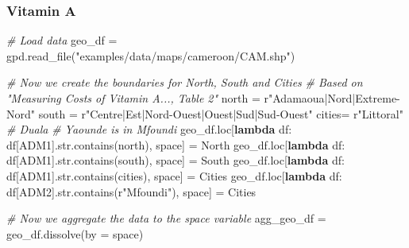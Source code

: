 \documentclass[
]{article}
\newenvironment{Shaded}{}{}
\newcommand{\BuiltInTok}[1]{#1}
\newcommand{\CommentTok}[1]{\textcolor[rgb]{0.38,0.63,0.69}{\textit{#1}}}
\newcommand{\KeywordTok}[1]{\textcolor[rgb]{0.00,0.44,0.13}{\textbf{#1}}}
\newcommand{\NormalTok}[1]{#1}
\newcommand{\OperatorTok}[1]{\textcolor[rgb]{0.40,0.40,0.40}{#1}}
\newcommand{\StringTok}[1]{\textcolor[rgb]{0.25,0.44,0.63}{#1}}
\newcommand{\VerbatimStringTok}[1]{\textcolor[rgb]{0.25,0.44,0.63}{#1}}
\begin{document}
\hypertarget{vitamin-a}{%
\subsubsection{Vitamin A}\label{vitamin-a}}

\begin{Shaded}
\begin{Highlighting}[numbers=left,,firstnumber=152,]
\CommentTok{\# Load data}
\NormalTok{geo\_df }\OperatorTok{=}\NormalTok{ gpd.read\_file(}\StringTok{"examples/data/maps/cameroon/CAM.shp"}\NormalTok{)}

\CommentTok{\# Now we create the boundaries for North, South and Cities}
\CommentTok{\# Based on "Measuring Costs of Vitamin A..., Table 2"}
\NormalTok{north }\OperatorTok{=} \VerbatimStringTok{r"Adamaoua|Nord|Extreme{-}Nord"}
\NormalTok{south }\OperatorTok{=} \VerbatimStringTok{r"Centre|Est|Nord{-}Ouest|Ouest|Sud|Sud{-}Ouest"}
\NormalTok{cities}\OperatorTok{=} \VerbatimStringTok{r"Littoral"} \CommentTok{\# Duala}
\CommentTok{\# Yaounde is in Mfoundi}
\NormalTok{geo\_df.loc[}\KeywordTok{lambda}\NormalTok{ df: df[}\StringTok{\textquotesingle{}ADM1\textquotesingle{}}\NormalTok{].}\BuiltInTok{str}\NormalTok{.contains(north), }\StringTok{\textquotesingle{}space\textquotesingle{}}\NormalTok{] }\OperatorTok{=} \StringTok{\textquotesingle{}North\textquotesingle{}}
\NormalTok{geo\_df.loc[}\KeywordTok{lambda}\NormalTok{ df: df[}\StringTok{\textquotesingle{}ADM1\textquotesingle{}}\NormalTok{].}\BuiltInTok{str}\NormalTok{.contains(south), }\StringTok{\textquotesingle{}space\textquotesingle{}}\NormalTok{] }\OperatorTok{=} \StringTok{\textquotesingle{}South\textquotesingle{}}
\NormalTok{geo\_df.loc[}\KeywordTok{lambda}\NormalTok{ df: df[}\StringTok{\textquotesingle{}ADM1\textquotesingle{}}\NormalTok{].}\BuiltInTok{str}\NormalTok{.contains(cities), }\StringTok{\textquotesingle{}space\textquotesingle{}}\NormalTok{] }\OperatorTok{=} \StringTok{\textquotesingle{}Cities\textquotesingle{}}
\NormalTok{geo\_df.loc[}\KeywordTok{lambda}\NormalTok{ df: df[}\StringTok{\textquotesingle{}ADM2\textquotesingle{}}\NormalTok{].}\BuiltInTok{str}\NormalTok{.contains(}\VerbatimStringTok{r"Mfoundi"}\NormalTok{), }\StringTok{\textquotesingle{}space\textquotesingle{}}\NormalTok{] }\OperatorTok{=} \StringTok{\textquotesingle{}Cities\textquotesingle{}}

\CommentTok{\# Now we aggregate the data to the \textasciigrave{}space\textasciigrave{} variable}
\NormalTok{agg\_geo\_df }\OperatorTok{=}\NormalTok{ geo\_df.dissolve(by }\OperatorTok{=} \StringTok{\textquotesingle{}space\textquotesingle{}}\NormalTok{)}



\end{Highlighting}
\end{Shaded}
\end{document}
